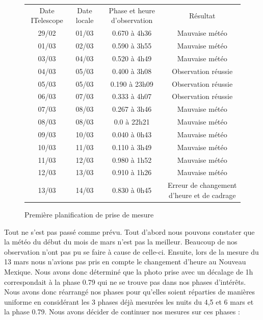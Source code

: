 \documentclass[10pt,french, openany]{book}
\begin{document}
\begin{figure}[h!]
    \centering
    \begin{tabular}{|c|c|c|c|}\hline
     Date ITelescope & Date locale & Phase et heure d'observation & Résultat \\ \hhline{|=|=|=|=|}
     29/02 & 01/03 & 0.670 à 4h36 & Mauvaise météo \\ \hline
     01/03 & 02/03 & 0.590 à 3h55 & Mauvaise météo\\ \hline
     03/03 & 04/03 & 0.520 à 4h49 & Mauvaise météo\\ \hline
     04/03 & 05/03 & 0.400 à 3h08 & Observation réussie\\ \hline
     05/03 & 05/03 & 0.190 à 23h09 & Observation réussie \\ \hline
     06/03 & 07/03 & 0.333 à 4h07 & Observation réussie\\ \hline
     07/03 & 08/03 & 0.267 à 3h46 & Mauvaise météo\\ \hline
     08/03 & 08/03 & 0.0 à 22h21 & Mauvaise météo\\ \hline
     09/03 & 10/03 & 0.040 à 0h43 & Mauvaise météo\\ \hline
     10/03 & 11/03 & 0.110 à 3h49 & Mauvaise météo\\ \hline
     11/03 & 12/03 & 0.980 à 1h52 & Mauvaise météo\\ \hline
     12/03 & 13/03 & 0.910 à 1h26 & Mauvaise météo\\ \hline
     13/03 & 14/03 & 0.830 à 0h45 & Erreur de changement d'heure et de cadrage\\ \hline
    \end{tabular}
    \caption{Première planification de prise de mesure}
    \label{fig:my_label}
\end{figure}

Tout ne s'est pas passé comme prévu. Tout d'abord nous pouvons constater que la météo du début du mois de mars n'est pas la meilleur. Beaucoup de nos observation n'ont pas pu se faire à cause de celle-ci. Ensuite, lors de la mesure du 13 mars nous n'avions pas pris en compte le changement d'heure au Nouveau Mexique. Nous avons donc déterminé que la photo prise avec un décalage de 1h correspondait à la phase 0.79 qui ne se trouve pas dans nos phases d'intérêts. Nous avons donc réarrangé nos phases pour qu'elles soient réparties de manières uniforme en considérant les 3 phases déjà mesurées les nuits du 4,5 et 6 mars et la phase 0.79. Nous avons décider de continuer nos mesures sur ces phases :
\end{document}
